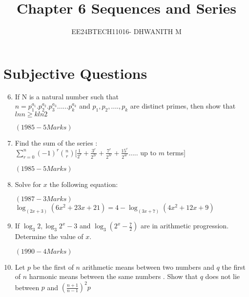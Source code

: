 \documentclass[journal,12pt,twocolumn]{IEEEtran}
\theoremstyle{remark}
\begin{document}

\vspace{3cm}

\title{Chapter 6 Sequences and Series}
\author{EE24BTECH11016- DHWANITH M}
\maketitle
\newpage
\bigskip

\renewcommand{\thefigure}{\theenumi}
\renewcommand{\thetable}{\theenumi}

\section*{Subjective Questions}
\begin{enumerate}
    \setcounter{enumi}{5}
    \item If N is a natural number such that
\\ 
$n= p_{1}^{a_1}.p_{2}^{a_2}.p_{3}^{a_3}......p_{k}^{a_k} $ and $ p_{1},p_{2},....,p_{k} $ are distinct primes, then show that $ ln n \geq k ln2 $                              
     
       \hfill$( 1985-5 Marks )$             


    \item Find the sum of the series : \\          $\sum_{r=0}^{n} (-1)^r \binom{n}{r}[\frac{1}{2^{r}}+\frac{3^{r}}{2^{2r}}+\frac{7^{r}}{2^{3r}}+\frac{15^{r}}{2^{4r}}.....$ up to $m$ terms$ ] $  
	    
		    \hfill$( 1985-5 Marks )$
	    
     \item Solve for $x$ the following equation:     
     
      \hfill$( 1987-3 Marks )$          \\              
		     $   \log_{(2x+3)}{(6x^{2}+23x+21)}=4-\log_{(3x+7)}{(4x^{2}+12x+9)} $

      \item If $ \log_{3}{2},\log_{3}{2^{x}-3} $ and $ \log_{3}{(2^{x}-\frac{7}{2})} $ are in arithmetic progression. Determine the value of $x$.  
     
       \hfill$(1990 -4 Marks)$
      

      \item Let $p$ be the first of $n$ arithmetic means between two numbers and $q$ the first of $n$ harmonic means between the same numbers . Show that $q$ does not lie between $p$ and $(\frac{n+1}{n-1})^{2}p$ 
       

\end{enumerate}
\end{document}
